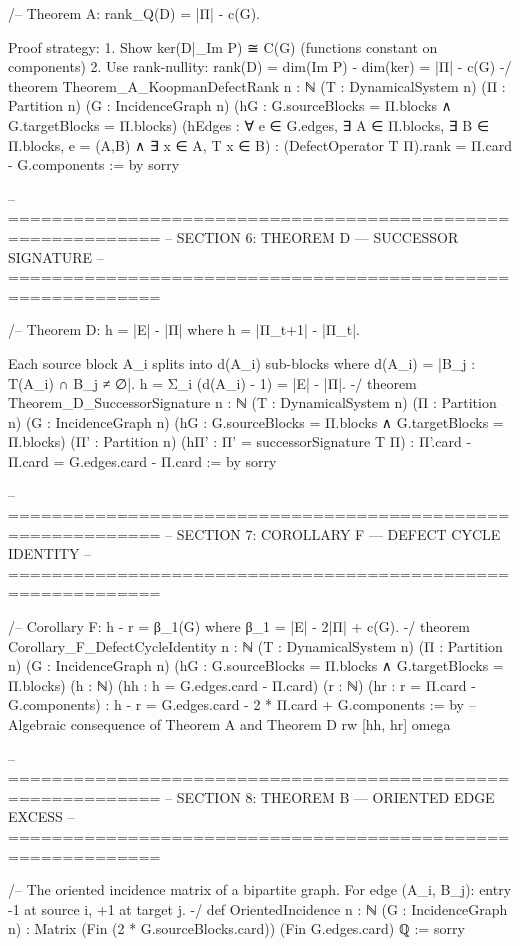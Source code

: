 /-- Theorem A: rank_Q(D) = |Π| - c(G).

    Proof strategy:
    1. Show ker(D|_{Im P}) ≅ C(G) (functions constant on components)
    2. Use rank-nullity: rank(D) = dim(Im P) - dim(ker) = |Π| - c(G)
-/
theorem Theorem_A_KoopmanDefectRank {n : ℕ} (T : DynamicalSystem n) (Π : Partition n)
    (G : IncidenceGraph n) (hG : G.sourceBlocks = Π.blocks ∧ G.targetBlocks = Π.blocks)
    (hEdges : ∀ e ∈ G.edges, ∃ A ∈ Π.blocks, ∃ B ∈ Π.blocks, e = (A,B) ∧ ∃ x ∈ A, T x ∈ B) :
    (DefectOperator T Π).rank = Π.card - G.components := by
  sorry

-- ============================================================
-- SECTION 6: THEOREM D — SUCCESSOR SIGNATURE
-- ============================================================

/-- Theorem D: h = |E| - |Π| where h = |Π_{t+1}| - |Π_t|.

    Each source block A_i splits into d(A_i) sub-blocks where
    d(A_i) = |{B_j : T(A_i) ∩ B_j ≠ ∅}|.
    h = Σ_i (d(A_i) - 1) = |E| - |Π|.
-/
theorem Theorem_D_SuccessorSignature {n : ℕ} (T : DynamicalSystem n) (Π : Partition n)
    (G : IncidenceGraph n) (hG : G.sourceBlocks = Π.blocks ∧ G.targetBlocks = Π.blocks)
    (Π' : Partition n) (hΠ' : Π' = successorSignature T Π) :
    Π'.card - Π.card = G.edges.card - Π.card := by
  sorry

-- ============================================================
-- SECTION 7: COROLLARY F — DEFECT CYCLE IDENTITY
-- ============================================================

/-- Corollary F: h - r = β_1(G) where β_1 = |E| - 2|Π| + c(G). -/
theorem Corollary_F_DefectCycleIdentity {n : ℕ} (T : DynamicalSystem n) (Π : Partition n)
    (G : IncidenceGraph n) (hG : G.sourceBlocks = Π.blocks ∧ G.targetBlocks = Π.blocks)
    (h : ℕ) (hh : h = G.edges.card - Π.card)
    (r : ℕ) (hr : r = Π.card - G.components) :
    h - r = G.edges.card - 2 * Π.card + G.components := by
  -- Algebraic consequence of Theorem A and Theorem D
  rw [hh, hr]
  omega

-- ============================================================
-- SECTION 8: THEOREM B — ORIENTED EDGE EXCESS
-- ============================================================

/-- The oriented incidence matrix of a bipartite graph.
    For edge (A_i, B_j): entry -1 at source i, +1 at target j. -/
def OrientedIncidence {n : ℕ} (G : IncidenceGraph n) : Matrix (Fin (2 * G.sourceBlocks.card)) (Fin G.edges.card) ℚ :=
  sorry


